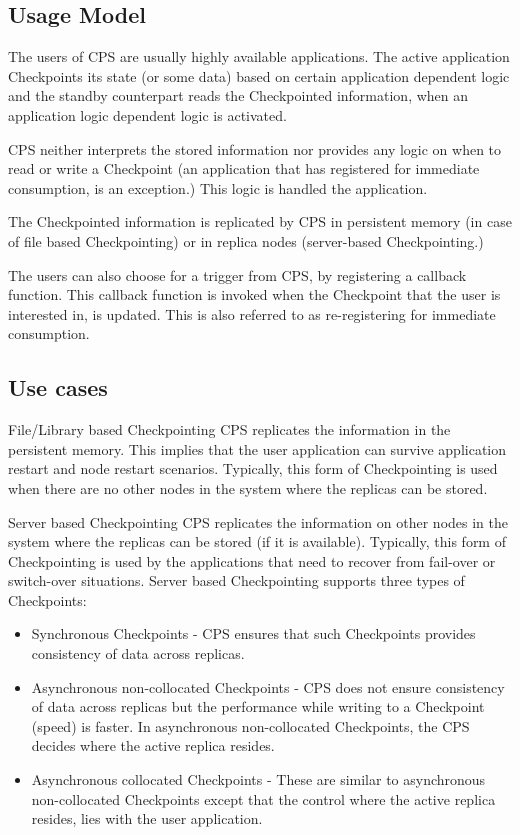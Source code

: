 \begin{flushleft}
\section{Usage Model}
The users of CPS are usually highly available applications. The active application Checkpoints its state (or some data) based on certain application 
dependent logic and the standby counterpart reads the Checkpointed information, when an application logic dependent logic is activated. 
\par
CPS neither interprets the stored information nor provides any logic on when to read or write a Checkpoint (an application that has 
registered for immediate consumption, is an exception.) This logic is handled the application.
\par
The Checkpointed information is replicated by CPS in persistent memory (in case of file based Checkpointing) or in replica nodes (server-based 
Checkpointing.)
\par
The users can also choose for a trigger from CPS, by registering a callback function. This callback function is invoked when the Checkpoint that the user 
is interested in, is updated.
This is also referred to as re-registering for immediate consumption.

\subsection{Use cases}
\begin{Desc}
\item
[File/Library  based Checkpointing]
CPS replicates the information in the persistent memory. This implies that the user application can survive application
restart and node restart scenarios. Typically, this form of Checkpointing is used  when there are no other nodes in the system where the replicas 
can be stored.
\end{Desc}

\begin{Desc}
\item
[Server based Checkpointing]
CPS replicates the information on other nodes in the system where the replicas can be stored (if it is available).
Typically, this form of Checkpointing is used by the applications that need to recover from  fail-over or switch-over situations.
Server based Checkpointing supports three types of Checkpoints:
\begin{itemize}
\item
Synchronous Checkpoints - CPS ensures that such Checkpoints provides consistency of data across replicas. 
\item
Asynchronous non-collocated Checkpoints -  CPS does not ensure consistency of data across replicas but the performance while writing to a
Checkpoint (speed) is faster. In asynchronous non-collocated Checkpoints, the CPS decides where the active replica resides. 
\item
Asynchronous collocated Checkpoints - These are similar to asynchronous non-collocated Checkpoints except that the control where
            the active replica resides, lies with the user application.
\end{itemize}
\end{Desc}


\end{flushleft}
